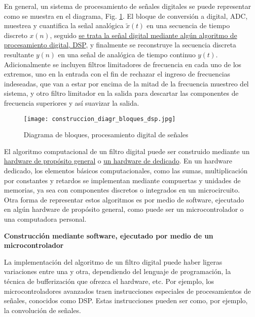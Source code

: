 \documentclass[informe.tex]{subfiles}
\begin{document}
En general, un sistema de procesamiento de señales digitales se puede representar como se muestra en el diagrama, Fig. \ref{fig:construccion:diagr_diagr_bloques_dsp}. El bloque de conversión  a digital, ADC, muestrea y cuantifica la señal analógica $\tilde{x}(t)$  en una secuencia de tiempo discreto $x(n)$, seguido \underline{se trata la señal digital mediante algún algoritmo de procesamiento digital, DSP,} y finalmente se reconstruye la secuencia discreta resultante $y(n)$ en una señal de analógica de tiempo continuo $y(t)$. Adicionalmente se incluyen filtros limitadores de frecuencia en cada uno de los extremos, uno en la entrada con el fin de rechazar el ingreso de frecuencias indeseadas, que van a estar por encima de la mitad de la frecuencia muestreo del sistema, y otro filtro limitador en la salida para descartar las componentes de frecuencia superiores y así suavizar la salida.\newline

	\begin{figure}[h]
		\centering
		\texttt{[image: construccion\_diagr\_bloques\_dsp.jpg]}
		\caption{Diagrama de bloques, procesamiento digital de señales}
		\label{fig:construccion:diagr_diagr_bloques_dsp}
	\end{figure}

El algoritmo computacional de un filtro digital puede ser construido mediante un \underline{hardware de propósito general} o \underline{un hardware de dedicado}. En un hardware dedicado, los elementos básicos computacionales, como las sumas, multiplicación por constantes y retardos se implementan mediante compuertas y unidades de memorias, ya sea con componentes discretos o integrados en un microcircuito. Otra forma de representar estos algoritmos es por medio de software, ejecutado en algún hardware de propósito general, como puede ser un microcontrolador o una computadora personal.\newline

\textbf{Construcción mediante software, ejecutado por medio de un microcontrolador}\newline

La implementación del algoritmo de un filtro digital puede haber ligeras variaciones entre una y otra, dependiendo del lenguaje de programación, la técnica de bufferización que ofrezca el hardware, etc. Por ejemplo, los microcontroladores avanzados traen instrucciones especiales de procesamientos de señales, conocidos como DSP. Estas instrucciones pueden ser como, por ejemplo, la convolución de señales.\newline
\end{document}
